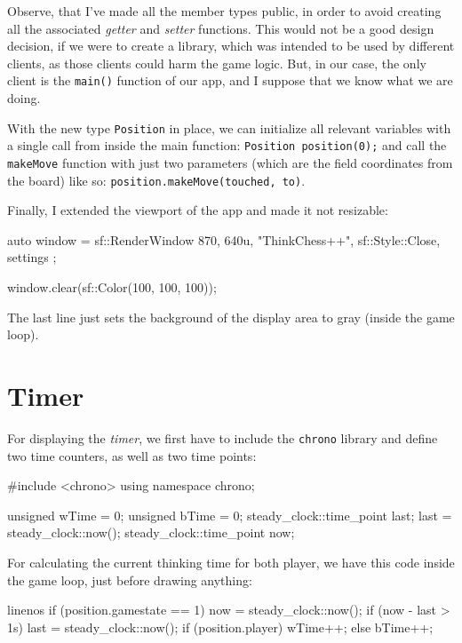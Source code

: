 Observe, that I've made all the member types public, in order to avoid creating all the associated
\emph{getter} and \emph{setter} functions.
This would not be a good design decision, if we were to create a library, which was intended to
be used by different clients, as those clients could harm the game logic.
But, in our case, the only client is the \texttt{main()} function of our app, and I suppose that
we know what we are doing.

With the new type \texttt{Position} in place, we can initialize all relevant variables with a single
call from inside the main function: \texttt{Position position(0);} and call the
\texttt{makeMove} function with just two parameters (which are the field coordinates from the board)
like so: \texttt{position.makeMove(touched, to)}.

Finally, I extended the viewport of the app and made it not resizable:

\begin{cpp}
auto window = sf::RenderWindow{ {870, 640u},
                                "ThinkChess++",
                                sf::Style::Close,
                                settings };

window.clear(sf::Color(100, 100, 100));
\end{cpp}

The last line just sets the background of the display area to gray (inside the game loop).

\section{Timer}

For displaying the \emph{timer}, we first have to include the \texttt{chrono} library
and define two time counters, as well as two time points:

\begin{cpp}
#include <chrono>
using namespace chrono;

unsigned wTime = 0;
unsigned bTime = 0;
steady_clock::time_point last;
last = steady_clock::now();
steady_clock::time_point now;
\end{cpp}

For calculating the current thinking time for both player, we have this code inside the
game loop, just before drawing anything:

\begin{cpp*}{linenos}
if (position.gamestate == 1) {
  now = steady_clock::now();
  if (now - last > 1s) {
    last = steady_clock::now();
    if (position.player) wTime++;
    else bTime++;
  }
}
\end{cpp*}

